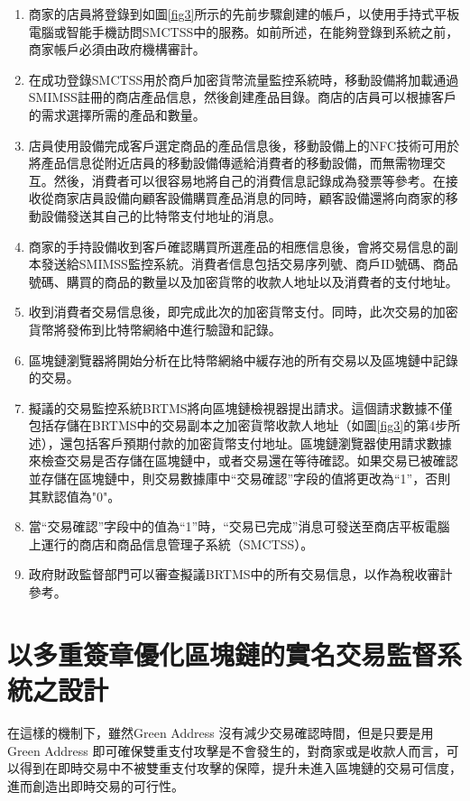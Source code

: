 		\begin{enumerate}
			\item 商家的店員將登錄到如圖\ref{fig3}所示的先前步驟創建的帳戶，以使用手持式平板電腦或智能手機訪問SMCTSS中的服務。如前所述，在能夠登錄到系統之前，商家帳戶必須由政府機構審計。
			\item 在成功登錄SMCTSS用於商戶加密貨幣流量監控系統時，移動設備將加載通過SMIMSS註冊的商店產品信息，然後創建產品目錄。商店的店員可以根據客戶的需求選擇所需的產品和數量。
			\item 店員使用設備完成客戶選定商品的產品信息後，移動設備上的NFC技術可用於將產品信息從附近店員的移動設備傳遞給消費者的移動設備，而無需物理交互。然後，消費者可以很容易地將自己的消費信息記錄成為發票等參考。在接收從商家店員設備向顧客設備購買產品消息的同時，顧客設備還將向商家的移動設備發送其自己的比特幣支付地址的消息。
			\item 商家的手持設備收到客戶確認購買所選產品的相應信息後，會將交易信息的副本發送給SMIMSS監控系統。消費者信息包括交易序列號、商戶ID號碼、商品號碼、購買的商品的數量以及加密貨幣的收款人地址以及消費者的支付地址。
			\item 收到消費者交易信息後，即完成此次的加密貨幣支付。同時，此次交易的加密貨幣將發佈到比特幣網絡中進行驗證和記錄。
			\item 區塊鏈瀏覽器將開始分析在比特幣網絡中緩存池的所有交易以及區塊鏈中記錄的交易。
			\item 擬議的交易監控系統BRTMS將向區塊鏈檢視器提出請求。這個請求數據不僅包括存儲在BRTMS中的交易副本之加密貨幣收款人地址（如圖\ref{fig3}的第4步所述），還包括客戶預期付款的加密貨幣支付地址。區塊鏈瀏覽器使用請求數據來檢查交易是否存儲在區塊鏈中，或者交易還在等待確認。如果交易已被確認並存儲在區塊鏈中，則交易數據庫中“交易確認”字段的值將更改為“1”，否則其默認值為"0"。
			\item 當“交易確認”字段中的值為“1”時，“交易已完成”消息可發送至商店平板電腦上運行的商店和商品信息管理子系統（SMCTSS）。
			\item 政府財政監督部門可以審查擬議BRTMS中的所有交易信息，以作為稅收審計參考。
		\end{enumerate}

\section{以多重簽章優化區塊鏈的實名交易監督系統之設計} 

在這樣的機制下，雖然Green Address 沒有減少交易確認時間，但是只要是用Green Address 即可確保雙重支付攻擊是不會發生的，對商家或是收款人而言，可以得到在即時交易中不被雙重支付攻擊的保障，提升未進入區塊鏈的交易可信度，進而創造出即時交易的可行性。 

